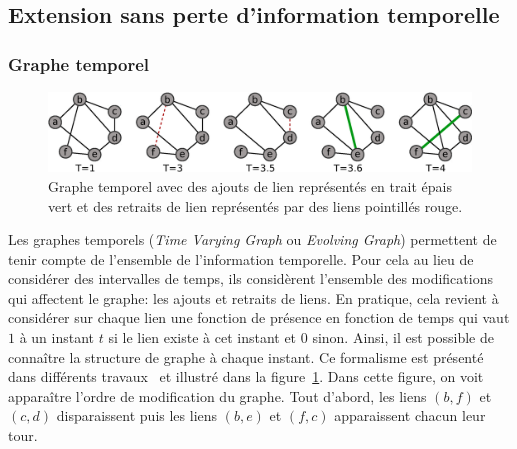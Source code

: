 
\subsection{Extension sans perte d'information temporelle}
\label{subsec:pasperte_info}
\subsubsection{Graphe temporel}
\begin{figure}[h]
\centering
\includegraphics[width=0.9\linewidth]{img/Intro/evolvingGraph.eps}
\caption{Graphe temporel avec des ajouts de lien représentés en trait épais vert et des retraits de lien représentés par des liens pointillés rouge.
}
\label{fig:exemple_evolving}
\end{figure}
Les graphes temporels (\emph{Time Varying Graph} ou \emph{Evolving Graph})
permettent de tenir compte de l'ensemble de l'information temporelle.
Pour cela au lieu de considérer des intervalles de temps, ils considèrent l'ensemble des modifications qui affectent le graphe: les ajouts et retraits de liens.
En pratique, cela revient à considérer sur chaque lien une fonction de présence en fonction de temps qui vaut $1$ à un instant $t$ si le lien existe à cet instant et $0$ sinon.
Ainsi, il est possible de connaître la structure de graphe à chaque instant.
Ce formalisme est présenté dans différents travaux~\cite{Casteigts2011,Wehmuth2015} et illustré dans la figure~\ref{fig:exemple_evolving}.
Dans cette figure, on voit apparaître l'ordre de modification du graphe.
Tout d'abord, les liens $(b,f)$ et $(c,d)$ disparaissent puis les liens $(b,e)$ et $(f,c)$ apparaissent chacun leur tour. 

